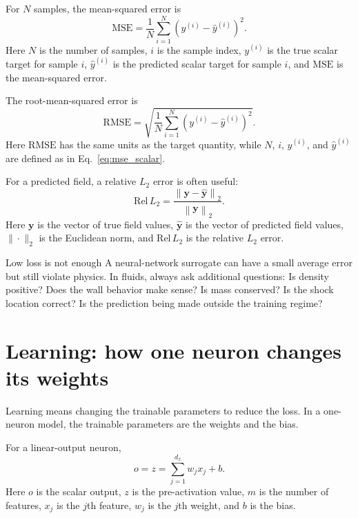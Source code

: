 \documentclass[11pt]{article}
\newcommand{\mse}{\mathrm{MSE}}
\newcommand{\rmse}{\mathrm{RMSE}}
\newcommand{\relL}{\mathrm{Rel}\,L_2}
\newcommand{\by}{\bm{y}}
\begin{document}
For $N$ samples, the mean-squared error is
\begin{equation}
    \mse = \frac{1}{N}\sum_{i=1}^{N}\left(y^{(i)}-\widehat{y}^{(i)}\right)^2.
    \label{eq:mse_scalar}
\end{equation}
Here $N$ is the number of samples, $i$ is the sample index, $y^{(i)}$ is the true scalar target for sample $i$, $\widehat{y}^{(i)}$ is the predicted scalar target for sample $i$, and $\mse$ is the mean-squared error.

The root-mean-squared error is
\begin{equation}
    \rmse = \sqrt{\frac{1}{N}\sum_{i=1}^{N}\left(y^{(i)}-\widehat{y}^{(i)}\right)^2}.
    \label{eq:rmse_scalar}
\end{equation}
Here $\rmse$ has the same units as the target quantity, while $N$, $i$, $y^{(i)}$, and $\widehat{y}^{(i)}$ are defined as in Eq.~\eqref{eq:mse_scalar}.

For a predicted field, a relative $L_2$ error is often useful:
\begin{equation}
    \relL = \frac{\left\|\by-\widehat{\by}\right\|_2}{\left\|\by\right\|_2}.
    \label{eq:rel_l2}
\end{equation}
Here $\by$ is the vector of true field values, $\widehat{\by}$ is the vector of predicted field values, $\|\cdot\|_2$ is the Euclidean norm, and $\relL$ is the relative $L_2$ error.

\begin{warnbox}{Low loss is not enough}
A neural-network surrogate can have a small average error but still violate physics.  In fluids, always ask additional questions: Is density positive?  Does the wall behavior make sense?  Is mass conserved?  Is the shock location correct?  Is the prediction being made outside the training regime?
\end{warnbox}

\section{Learning: how one neuron changes its weights}

Learning means changing the trainable parameters to reduce the loss.  In a one-neuron model, the trainable parameters are the weights and the bias.

For a linear-output neuron,
\begin{equation}
    o = z = \sum_{j=1}^{d_x} w_jx_j+b.
    \label{eq:linear_neuron_output}
\end{equation}
Here $o$ is the scalar output, $z$ is the pre-activation value, $m$ is the number of features, $x_j$ is the $j$th feature, $w_j$ is the $j$th weight, and $b$ is the bias.
\end{document}
